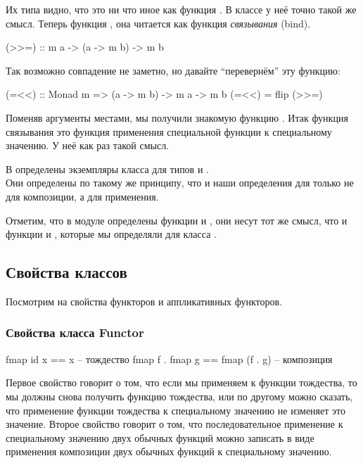 Их типа видно, что это ни что иное как функция . В классе
 у неё точно такой же смысл. Теперь функция \In{>>=}, она
читается как функция \emph{связывания} (bind).


\begin{code}
(>>=)  :: m a -> (a -> m b) -> m b
\end{code}

Так возможно совпадение не заметно, но давайте ``перевернём'' эту
функцию:


\begin{code}
(=<<)  :: Monad m => (a -> m b) -> m a -> m b
(=<<) = flip (>>=)
\end{code}

Поменяв аргументы местами, мы получили знакомую функцию \In{*$}. Итак
функция связывания это функция применения специальной функции к
специальному значению. У неё как раз такой смысл.

В  определены экземпляры класса  для типов
 и \In{[]}.\\Они определены по такому же принципу, что и наши
определения для  только не для композиции, а для применения.

Отметим, что в модуле  определены функции
 и , они несут тот же смысл, что и функции
 и , которые мы определяли для класса
.

\subsection{Свойства классов}

Посмотрим на свойства функторов и аппликативных функторов.

\subsubsection{Свойства класса Functor}


\begin{code}
fmap id x           == x                -- тождество
fmap f . fmap g     == fmap (f . g)     -- композиция
\end{code}

Первое свойство говорит о том, что если мы применяем  к функции
тождества, то мы должны снова получить функцию тождества, или по другому
можно сказать, что применение функции тождества к специальному значению
не изменяет это значение. Второе свойство говорит о том, что
последовательное применение к специальному значению двух обычных функций
можно записать в виде применения композиции двух обычных функций к
специальному значению.

